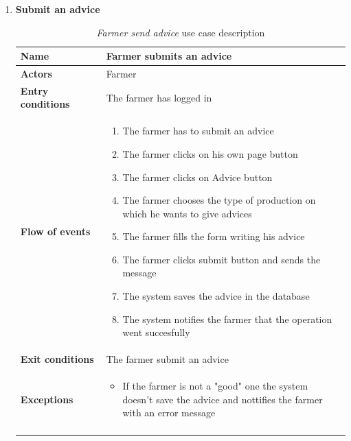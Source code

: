 \begin{enumerate}
    \item \textbf{Submit an advice}
    \begin{longtable}{p{0.26\linewidth}p{0.75\linewidth}}
        \toprule
        \textbf{Name} & \textbf{Farmer submits an advice} \\
        \midrule
        \textbf{Actors} & Farmer \\
        \midrule
        \textbf{Entry conditions} & The farmer has logged in\\
        \midrule
        \textbf{Flow of events} & 
        \begin{enumerate}
            \item The farmer has to submit an advice 
            \item The farmer clicks on his own page button
            \item The farmer clicks on Advice button
            \item The farmer chooses the type of production on which he wants to give advices
            \item The farmer fills the form writing his advice
            \item The farmer clicks submit button and sends the message
            \item The system saves the advice in the database
            \item The system notifies the farmer that the operation went succesfully 
        \end{enumerate} \\
        \midrule
        \textbf{Exit conditions} & The farmer submit an advice\\
        \midrule
        \textbf{Exceptions} & 
        \begin{itemize}
            \item If the farmer is not a "good" one the system doesn't save the advice and nottifies the farmer with an error message
        \end{itemize}\\
        \bottomrule
        \caption{\emph{Farmer send advice} use case description}
    \end{longtable}


\end{enumerate}
